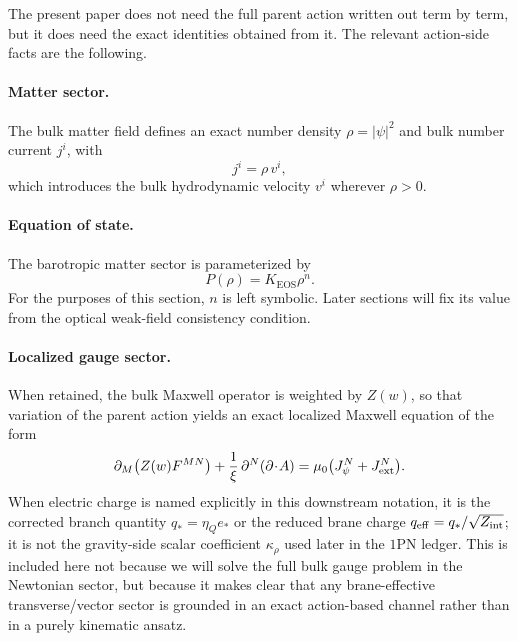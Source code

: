 \documentclass[11pt]{article}
\newcommand{\Zloc}{Z}
\newcommand{\krho}{\kappa_{\rho}}
\newcommand{\KEOS}{K_{\mathrm{EOS}}}
\newcommand{\etaQ}{\eta_Q}
\newcommand{\qstar}{q_*}
\newcommand{\estar}{e_*}
\newcommand{\qeff}{q_{\mathrm{eff}}}
\begin{document}
The present paper does not need the full parent action written out term by term, but it
does need the exact identities obtained from it. The relevant action-side facts are the
following.

\paragraph{Matter sector.}
The bulk matter field defines an exact number density \(\rho=|\psi|^2\) and bulk number
current \(j^i\), with
\begin{equation}
j^i = \rho\,v^i,
\label{eq:dictionary-bulk-velocity}
\end{equation}
which introduces the bulk hydrodynamic velocity \(v^i\) wherever \(\rho>0\).

\paragraph{Equation of state.}
The barotropic matter sector is parameterized by
\begin{equation}
P(\rho)=\KEOS \rho^n.
\label{eq:dictionary-eos}
\end{equation}
For the purposes of this section, \(n\) is left symbolic. Later sections will fix its
value from the optical weak-field consistency condition.

\paragraph{Localized gauge sector.}
When retained, the bulk Maxwell operator is weighted by \(\Zloc(w)\), so that variation of
the parent action yields an exact localized Maxwell equation of the form
\begin{equation}
\partial_M\!\left(\Zloc(w)F^{MN}\right)
+\frac{1}{\xi}\,\partial^N(\partial\!\cdot\!A)
=
\mu_0\bigl(J_\psi^N+J_{\rm ext}^N\bigr).
\label{eq:dictionary-maxwell}
\end{equation}
When electric charge is named explicitly in this downstream notation, it is the corrected
branch quantity \(\qstar=\etaQ\estar\) or the reduced brane charge
\(\qeff=\qstar/\sqrt{Z_{\rm int}}\); it is not the gravity-side scalar coefficient
\(\krho\) used later in the \(1\)PN ledger.
This is included here not because we will solve the full bulk gauge problem in the
Newtonian sector, but because it makes clear that any brane-effective transverse/vector
sector is grounded in an exact action-based channel rather than in a purely kinematic
ansatz.
\end{document}
